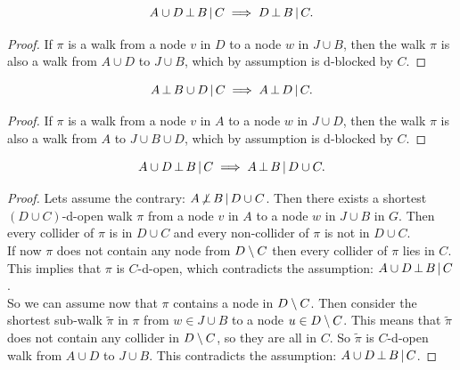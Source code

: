 \begin{Lem}
    \[ A \cup D \operatorname*{\perp}  B \operatorname*{|} C \implies D \operatorname*{\perp}  B \operatorname*{|} C.\]
\begin{proof}
If $\pi$ is a walk from a node $v$ in $D$ to a node $w$ in $J \cup B$, then 
the walk $\pi$ is also a walk from $A \cup D$ to $J \cup B$, which by assumption is d-blocked by $C$.
\end{proof}
\end{Lem}

\begin{Lem}
    \[ A \operatorname*{\perp}  B \cup D\operatorname*{|} C  \implies A \operatorname*{\perp}  D \operatorname*{|} C.\]
\begin{proof}
If $\pi$ is a walk from a node $v$ in $A$ to a node $w$ in $J \cup D$, then %
the walk  $\pi$ is also a walk from $A$ to $J \cup B \cup D$, which by assumption is d-blocked by $C$. 
\end{proof}
\end{Lem}

\begin{Lem}
    \label{d-sep-left-weak-union}
    \[A \cup D \operatorname*{\perp}  B  \operatorname*{|} C \implies A \operatorname*{\perp}  B \operatorname*{|} D\cup C.\]
\begin{proof}
    Lets assume the contrary:  $A \operatorname*{\not\perp}  B \operatorname*{|} D\cup C$. Then there exists a shortest $(D \cup C)$-d-open walk $\pi$ 
    from a node $v$ in $A$ to a node $w$ in $J \cup B$ in $G$.
    Then every collider of $\pi$ is in $D \cup C$ and every non-collider of $\pi$ is not in $D \cup C$.\\
    If now $\pi$ does not contain any node from $D \setminus C$ then every collider of $\pi$ lies in $C$. 
    This implies that $\pi$ is $C$-d-open, 
    which contradicts the assumption: $A \cup D \operatorname*{\perp}  B  \operatorname*{|} C$.\\
    So we can assume now that $\pi$ contains a node in $D \setminus C$. 
    Then consider the shortest sub-walk $\tilde \pi$ in 
    $\pi$ from $w \in J \cup B$ to a node $u \in D \setminus C$. This means that $\tilde \pi$ does not contain any collider in $D\setminus C$, 
    so they are all in $C$. So $\tilde \pi$ is $C$-d-open walk from $A \cup D$ to $J \cup B$. 
    This contradicts the assumption: $A \cup D \operatorname*{\perp}  B  \operatorname*{|} C$.
\end{proof}
\end{Lem}

